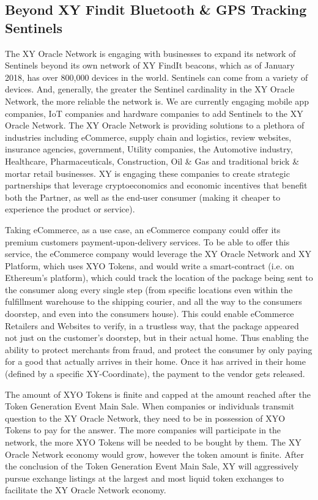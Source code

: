 \documentclass{article}
\begin{document}
\subsection {Beyond XY Findit Bluetooth \& GPS Tracking Sentinels}
The XY Oracle Network is engaging with businesses to expand its network of Sentinels beyond its own network of XY FindIt beacons, which as of January 2018, has over 800,000 devices in the world. Sentinels can come from a variety of devices. And, generally, the greater the Sentinel cardinality in the XY Oracle Network, the more reliable the network is. We are currently engaging mobile app companies, IoT companies and hardware companies to add Sentinels to the XY Oracle Network. The XY Oracle Network is providing solutions to a plethora of industries including eCommerce, supply chain and logistics, review websites, insurance agencies, government, Utility companies, the Automotive industry, Healthcare, Pharmaceuticals, Construction, Oil \& Gas and traditional brick \& mortar retail businesses. XY is engaging these companies to create strategic partnerships that leverage \gls{cryptoeconomics} and economic incentives that benefit both the Partner, as well as the end-user consumer (making it cheaper to experience the product or service). 

Taking eCommerce, as a use case, an eCommerce company could offer its premium customers payment-upon-delivery services. To be able to offer this service, the eCommerce company would leverage the XY Oracle Network and XY Platform, which uses XYO Tokens, and would write a \gls{smart-contract} (i.e. on Ethereum's platform), which could track the location of the package being sent to the consumer along every single step (from specific locations even within the fulfillment warehouse to the shipping courier, and all the way to the consumers doorstep, and even into the consumers house). This could enable eCommerce Retailers and Websites to verify, in a trustless way, that the package appeared not just on the customer's doorstep, but in their actual home. Thus enabling the ability to protect merchants from fraud, and protect the consumer by only paying for a good that actually arrives in their home. Once it has arrived in their home (defined by a specific XY-Coordinate), the payment to the vendor gets released.

The amount of XYO Tokens is finite and capped at the amount reached after the Token Generation Event Main Sale. When companies or individuals transmit question to the XY Oracle Network, they need to be in possession of XYO Tokens to pay for the answer. The more companies will participate in the network, the more XYO Tokens will be needed to be bought by them. The XY Oracle Network economy would grow, however the token amount is finite.
After the conclusion of the Token Generation Event Main Sale, XY will aggressively pursue exchange listings at the largest and most liquid token exchanges to facilitate the XY Oracle Network economy.
\end{document}
